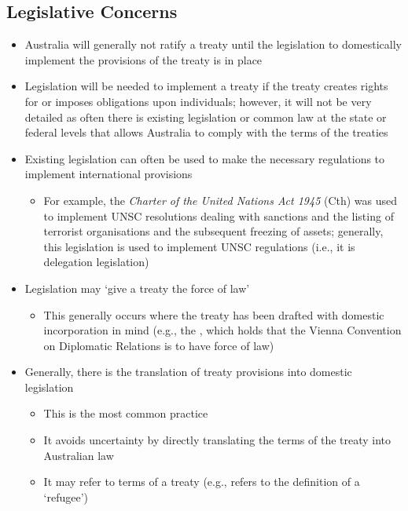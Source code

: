 \subsection{Legislative Concerns}
\begin{itemize}
    \item Australia will generally not ratify a treaty until the legislation to domestically implement the provisions of the treaty is in place
    \item Legislation will be needed to implement a treaty if the treaty creates rights for or imposes obligations upon individuals; however, it will not be very detailed as often there is existing legislation or common law at the state or federal levels that allows Australia to comply with the terms of the treaties
    \item Existing legislation can often be used to make the necessary regulations to implement international provisions
    \begin{itemize}
        \item For example, the \textit{Charter of the United Nations Act 1945} (Cth) was used to implement UNSC resolutions dealing with sanctions and the listing of terrorist organisations and the subsequent freezing of assets; generally, this legislation is used to implement UNSC regulations (i.e., it is delegation legislation)
    \end{itemize}
    \item Legislation may `give a treaty the force of law'
    \begin{itemize}
        \item This generally occurs where the treaty has been drafted with domestic incorporation in mind (e.g., the , which holds that the Vienna Convention on Diplomatic Relations is to have force of law)
    \end{itemize}
    \item Generally, there is the translation of treaty provisions into domestic legislation
    \begin{itemize}
        \item This is the most common practice
        \item It avoids uncertainty by directly translating the terms of the treaty into Australian law
        \item It may refer to terms of a treaty (e.g.,  refers to the definition of a `refugee')
    \end{itemize}

\end{itemize}

